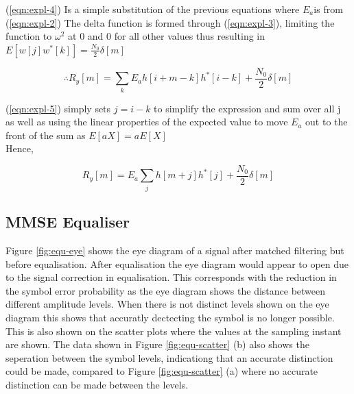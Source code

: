 (\ref{eqn:expl-4}) Is a simple substitution of the previous equations where $E_a$is from (\ref{eqn:expl-2}) The delta function is formed 
through (\ref{eqn:expl-3}), limiting the function to $\omega^2$ at 0 and 0 for all other values thus resulting in
$E[w[j]w^*[k]] = \frac{N_0}{2} \delta[m]$

\begin{equation}
    \label{eqn:expl-4}
    \therefore R_y[m] = \sum_k E_a h[i+m-k]h^*[i-k]+ \frac{N_0}{2}\delta [m]
\end{equation}

(\ref{eqn:expl-5}) simply sets $j=i-k$ to simplify the expression and sum over all j as well as using the linear properties of
the expected value to move $E_a$ out to the front of the sum as $E[aX] = aE[X]$\\

Hence,

\begin{equation}
    \label{eqn:expl-5}
    R_y[m] = E_a \sum_j h[m+j]h^*[j] + \frac{N_0}{2} \delta [m]
\end{equation}

\subsection{MMSE Equaliser}

Figure \ref{fig:equ-eye} shows the eye diagram of a signal after matched filtering but before equalisation. After equalisation
the eye diagram would appear to open due to the signal correction in equalisation. This corresponds with the reduction in the
symbol error probability as the eye diagram shows the distance between different amplitude levels. When there is not distinct levels
shown on the eye diagram this shows that accuratly dectecting the symbol is no longer possible. This is also shown on the scatter plots 
where the values at the sampling instant are shown. The data shown in Figure \ref{fig:equ-scatter} (b) also shows the seperation
between the symbol levels, indicationg that an accurate distinction could be made, compared to Figure \ref{fig:equ-scatter} (a)
where no accurate distinction can be made between the levels.

